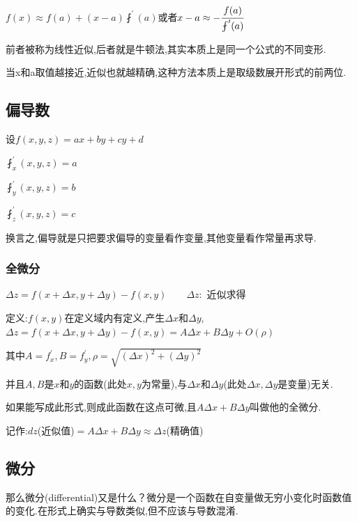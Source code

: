 \documentclass[UTF8,12pt]{ctexbook}
\newcommand{\derivative}{^\prime}
\newcommand{\partialDerivative}[1]{^\prime_{#1}}
\newcommand{\fDerivative}[1]{\fint\derivative(#1)}
\newcommand{\defFunction}[1]{f(#1)}
\begin{document}
{{{{    $\defFunction{x} \approx \defFunction{a} + (x-a)\fDerivative{a}$或者$x - a \approx -\cfrac{\defFunction{a}}{\fDerivative{a}}$

    前者被称为线性近似,后者就是牛顿法,其实本质上是同一个公式的不同变形.

    当x和a取值越接近,近似也就越精确,这种方法本质上是取级数展开形式的前两位.

  }%

}%

\subsection{偏导数}{

  设$\defFunction{x,y,z} = ax + by + cy + d$

  $\fint\partialDerivative{x}(x,y,z) = a$

  $\fint\partialDerivative{y}(x,y,z) = b$

  $\fint\partialDerivative{z}(x,y,z) = c$

  换言之,偏导就是只把要求偏导的变量看作变量,其他变量看作常量再求导.

  \subsubsection{全微分}{

    $\Delta z = \defFunction{x + \Delta x,y + \Delta y} - \defFunction{x,y}\qquad\Delta z : $ 近似求得

    定义:$\defFunction{x,y}$在定义域内有定义,产生$\Delta x$和$\Delta y$,$\Delta z = \defFunction{x + \Delta x,y + \Delta y} - \defFunction{x,y} = A\Delta x + B\Delta y + O(\rho)$

    其中$A = f\partialDerivative{x}, B = f\partialDerivative{y}, \rho = \sqrt{(\Delta x)^2 + (\Delta y)^2}$

    并且$A,B$是$x$和$y$的函数(此处$x,y$为常量),与$\Delta x$和$\Delta y$(此处$\Delta x, \Delta y$是变量)无关.

    如果能写成此形式,则成此函数在这点可微,且$A\Delta x + B\Delta y$叫做他的全微分.

    记作:$dz$(近似值)$= A\Delta x + B\Delta y \approx \Delta z$(精确值)

  }

}%

\subsection{微分}{
那么微分(differential)又是什么？微分是一个函数在自变量做无穷小变化时函数值的变化.在形式上确实与导数类似,但不应该与导数混淆.

}}}
\end{document}
